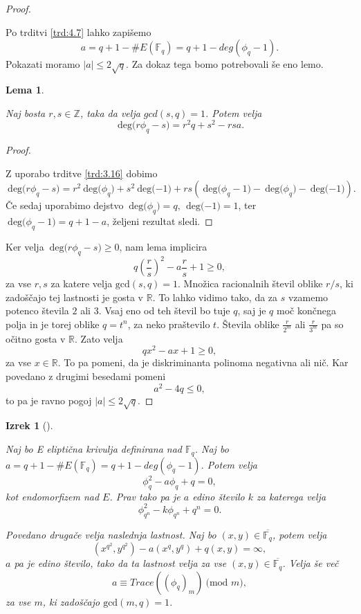\documentclass[12pt,a4paper,twoside]{article}
\theoremstyle{definition} %
\theoremstyle{plain} %
\newtheorem{lema}[definicija]{Lema}
\newtheorem{izrek}[definicija]{Izrek}
\numberwithin{equation}{section}  %
\newcommand{\R}{\mathbb R}
\newcommand{\Z}{\mathbb Z}
\newcommand{\F}{\mathbb F}
\newcommand{\E}[1]{E({#1})}
\newcommand{\MOD}[1]{\ \text{(mod }{#1}\text{)}}
\newcommand{\DEG}[1]{\ \text{deg(}{#1}\text{)}}
\begin{document}
\begin{proof}~

Po trditvi \ref{trd:4.7} lahko zapišemo
$$a=q+1-\#\E{\F_q} = q+1 -deg(\phi_q-1).$$
Pokazati moramo $|a| \leq 2\sqrt{q}.$
Za dokaz tega bomo potrebovali še eno lemo.
\begin{lema}~

Naj bosta $r,s \in \Z$, taka da velja $gcd(s,q)=1$. Potem velja
$$\DEG{r\phi_q-s} = r^2q+s^2-rsa.$$
\end{lema}

\begin{proof}~

Z uporabo trditve \ref{trd:3.16} dobimo
$$\DEG{r\phi_q-s} = r^2\DEG{\phi_q}+s^2\DEG{-1}+rs(\DEG{\phi_q-1}-\DEG{\phi_q}-\DEG{-1}).$$
Če sedaj uporabimo dejstvo $\DEG{\phi_q} = q,\ \DEG{-1} = 1$, ter $\DEG{\phi_q-1} = q+1-a$, željeni rezultat sledi.
\end{proof}

Ker velja $\DEG{r\phi_q-s} \geq 0$, nam lema implicira
$$q \left( \frac{r}{s} \right)^2-a\frac{r}{s}+1 \geq 0,$$
za vse $r,s$ za katere velja $\text{gcd}(s,q)=1$. Množica racionalnih števil oblike $r/s$, ki zadoščajo tej lastnosti je gosta v $\R$. To lahko vidimo tako, da za $s$ vzamemo potenco števila $2$ ali $3$. Vsaj eno od teh števil bo tuje $q$, saj je $q$ moč končnega polja in je torej oblike $q = t^n$, za neko praštevilo $t$. Števila oblike $\frac{r}{2^m}$ ali $\frac{r}{3^m}$ pa so očitno gosta v $\R$. Zato velja
$$qx^2-ax + 1 \geq 0,$$
za vse $x\in \R$. To pa pomeni, da je diskriminanta polinoma negativna ali nič. Kar povedano z drugimi besedami pomeni
$$a^2-4q \leq 0,$$
to pa je ravno pogoj $|a|\leq 2\sqrt{q}$.


\end{proof}


\begin{izrek}[]~

\label{izrek:4.10}

Naj bo E eliptična krivulja definirana nad $\F_q$. Naj bo $a = q+1-\#\E{\F_q} = q+1-deg(\phi_q-1)$. Potem velja
$$\phi^2_q-a\phi_q+q = 0,$$
kot endomorfizem nad $E$. Prav tako pa je $a$ edino število $k$ za katerega velja
$$\phi^2_{q^n}-k\phi_{q^n}+q^n = 0.$$

Povedano drugače velja naslednja lastnost. Naj bo $(x,y) \in  \overline{\F_q}$, potem velja
$$(x^{q^2},y^{q^2})-a(x^q,y^q)+q(x,y) = \infty,$$
$a$ pa je edino število, tako da ta lastnost velja za vse $(x,y) \in \overline{\F_q} $. Velja še več
$$a \equiv Trace((\phi_q)_m) \MOD{m},$$
za vse $m$, ki zadoščajo $\text{gcd}(m,q)=1$.

\end{izrek}
\end{document}
